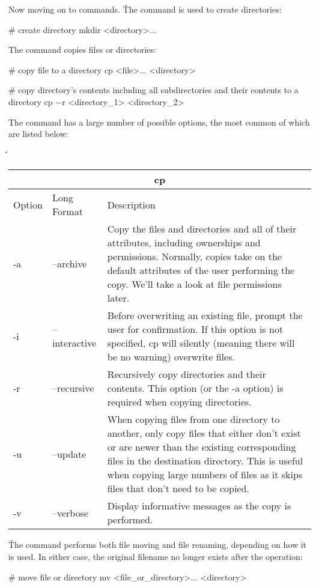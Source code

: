 Now moving on to commands. \v

The  command is used to create directories:
\begin{bash}
# create directory
mkdir <directory>...
\end{bash}

The  command copies files or directories:
\begin{bash}
# copy file to a directory
cp <file>... <directory>
\end{bash}

\begin{bash}
# copy directory's contents including all subdirectories and their contents to a directory
cp $-$r <directory_1> <directory_2>
\end{bash}

The  command has a large number of possible options, the most common of which are listed below:

\v

\begin{tabular}{ |p{1cm}|p{3cm}||p{10.6cm}| }
\hline
\multicolumn{3}{|c|}{cp} \\
\hline
Option& Long Format& Description\\
\hline
-a & --archive & Copy the files and directories and all of their attributes, including ownerships and permissions. Normally, copies take on the default attributes of the user performing the copy. We'll take a look at file permissions later.\\
-i & --interactive & Before overwriting an existing file, prompt the user for confirmation. If this option is not specified, cp will silently (meaning there will be no warning) overwrite files.\\
-r & --recursive & Recursively copy directories and their contents. This option (or the -a option) is required when copying directories.\\
-u & --update & When copying files from one directory to another, only copy files that either don't exist or are newer than the existing corresponding files in the destination directory. This is useful when copying large numbers of files as it skips files that don't need to be copied.\\
-v & --verbose & Display informative messages as the copy is performed.\\
\hline
\end{tabular}

\v

The  command performs both file moving and file renaming, depending on how it is used. In either case,
the original filename no longer exists after the operation:
\begin{bash}
# move file or directory
mv <file_or_directory>... <directory>
\end{bash}

